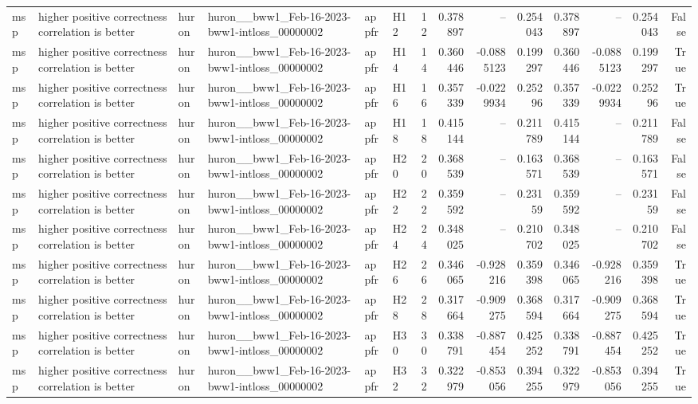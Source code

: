 \begin{longtable}{llllllrrrrrrrr}
msp & higher positive correctness correlation is better & huron & huron\_\_bww1\_Feb-16-2023-bww1-intloss\_00000002 & appfr & H12 & 12 & 0.378897 & -- & 0.254043 & 0.378897 & -- & 0.254043 & False \\
msp & higher positive correctness correlation is better & huron & huron\_\_bww1\_Feb-16-2023-bww1-intloss\_00000002 & appfr & H14 & 14 & 0.360446 & -0.0885123 & 0.199297 & 0.360446 & -0.0885123 & 0.199297 & True \\
msp & higher positive correctness correlation is better & huron & huron\_\_bww1\_Feb-16-2023-bww1-intloss\_00000002 & appfr & H16 & 16 & 0.357339 & -0.0229934 & 0.25296 & 0.357339 & -0.0229934 & 0.25296 & True \\
msp & higher positive correctness correlation is better & huron & huron\_\_bww1\_Feb-16-2023-bww1-intloss\_00000002 & appfr & H18 & 18 & 0.415144 & -- & 0.211789 & 0.415144 & -- & 0.211789 & False \\
msp & higher positive correctness correlation is better & huron & huron\_\_bww1\_Feb-16-2023-bww1-intloss\_00000002 & appfr & H20 & 20 & 0.368539 & -- & 0.163571 & 0.368539 & -- & 0.163571 & False \\
msp & higher positive correctness correlation is better & huron & huron\_\_bww1\_Feb-16-2023-bww1-intloss\_00000002 & appfr & H22 & 22 & 0.359592 & -- & 0.23159 & 0.359592 & -- & 0.23159 & False \\
msp & higher positive correctness correlation is better & huron & huron\_\_bww1\_Feb-16-2023-bww1-intloss\_00000002 & appfr & H24 & 24 & 0.348025 & -- & 0.210702 & 0.348025 & -- & 0.210702 & False \\
msp & higher positive correctness correlation is better & huron & huron\_\_bww1\_Feb-16-2023-bww1-intloss\_00000002 & appfr & H26 & 26 & 0.346065 & -0.928216 & 0.359398 & 0.346065 & -0.928216 & 0.359398 & True \\
msp & higher positive correctness correlation is better & huron & huron\_\_bww1\_Feb-16-2023-bww1-intloss\_00000002 & appfr & H28 & 28 & 0.317664 & -0.909275 & 0.368594 & 0.317664 & -0.909275 & 0.368594 & True \\
msp & higher positive correctness correlation is better & huron & huron\_\_bww1\_Feb-16-2023-bww1-intloss\_00000002 & appfr & H30 & 30 & 0.338791 & -0.887454 & 0.425252 & 0.338791 & -0.887454 & 0.425252 & True \\
msp & higher positive correctness correlation is better & huron & huron\_\_bww1\_Feb-16-2023-bww1-intloss\_00000002 & appfr & H32 & 32 & 0.322979 & -0.853056 & 0.394255 & 0.322979 & -0.853056 & 0.394255 & True \\

\end{longtable}
